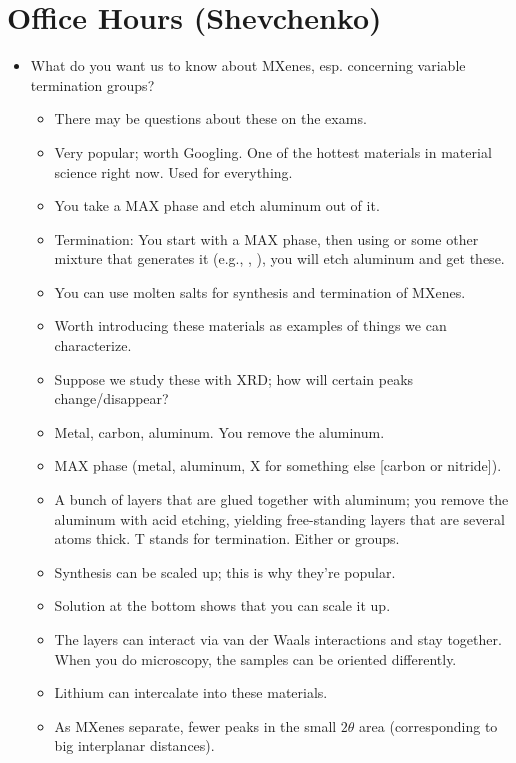 \documentclass[../notes.tex]{subfiles}
\begin{document}
\section{Office Hours (Shevchenko)}
\begin{itemize}
    \item {}What do you want us to know about MXenes, esp. concerning variable termination groups?
    \begin{itemize}
        \item There may be questions about these on the exams.
        \item Very popular; worth Googling. One of the hottest materials in material science right now. Used for everything.
        \item You take a MAX phase and etch aluminum out of it.
        \item Termination: You start with a MAX phase, then using  or some other mixture that generates it (e.g., , ), you will etch aluminum and get these.
        \item You can use molten salts for synthesis and termination of MXenes.
        \item Worth introducing these materials as examples of things we can characterize.
        \item Suppose we study these with XRD; how will certain peaks change/disappear?
        \item Metal, carbon, aluminum. You remove the aluminum.
        \item MAX phase (metal, aluminum, X for something else [carbon or nitride]).
        \item A bunch of layers that are glued together with aluminum; you remove the aluminum with acid etching, yielding free-standing layers that are several atoms thick. T stands for termination. Either  or  groups.
        \item Synthesis can be scaled up; this is why they're popular.
        \item Solution at the bottom shows that you can scale it up.
        \item The layers can interact via van der Waals interactions and stay together. When you do microscopy, the samples can be oriented differently.
        \item Lithium can intercalate into these materials.
        \item As MXenes separate, fewer peaks in the small $2\theta$ area (corresponding to big interplanar distances).

\end{itemize}
\end{itemize}
\end{document}
